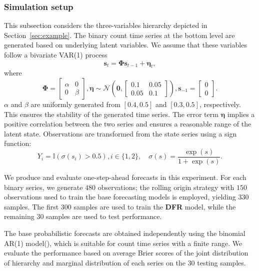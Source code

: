 \documentclass[a4paper,review,12pt,authoryear]{elsarticle}
\begin{document}
    \subsubsection{Simulation setup}
    This subsection considers the three-variables hierarchy depicted in Section~\ref{sec:example}.
    The binary count time series at the bottom level are generated based on underlying latent variables. 
    We assume that these variables follow a bivariate VAR(1) process
    \[\mathbf{s}_t = \mathbf{\Phi}\mathbf{s}_{t-1}+\boldsymbol{\eta}_t,\]
    where
    \[
      \mathbf{\Phi} = \left[\begin{matrix}
        \alpha & 0 \\
        0 & \beta
      \end{matrix}\right], \boldsymbol{\eta} \sim \mathcal{N}\left(\mathbf{0}, \left[\begin{matrix}
        0.1 & 0.05 \\
        0.05 & 0.1 
      \end{matrix}\right]\right), \mathbf{s}_{-1} = \left[
        \begin{matrix}0 \\ 0\end{matrix}
      \right].
    \]
    $\alpha$ and $\beta$ are uniformly generated from $[0.4, 0.5]$ and $[0.3,0.5]$, respectively. 
    This ensures the stability of the generated time series.
    The error term $\boldsymbol{\eta}$ implies a positive correlation between the two series and ensures a reasonable range of the latent state.
    Observations are transformed from the state series using a sign function:
    \[
        Y_i = \mathbb{I}(\sigma(s_i) > 0.5), i\in\{1, 2\},\quad \sigma(s) = \frac{\exp(s)}{1+\exp(s)}.
    \]

    We produce and evaluate one-step-ahead forecasts in this experiment.
    For each binary series, we generate $480$ observations; the rolling origin strategy with $150$ observations used to train the base forecasting models is employed, yielding $330$ samples.
    The first $300$ samples are used to train the \textbf{DFR} model, while the remaining $30$ samples are used to test performance.
    
    The base probabilistic forecasts are obtained independently using the binomial AR(1) model(\citealp{weissParameterEstimationBinomial2013}), which is suitable for count time series with a finite range.
    We evaluate the performance based on average Brier scores of the joint distribution of hierarchy and marginal distribution of each series on the $30$ testing samples.
     
\end{document}
